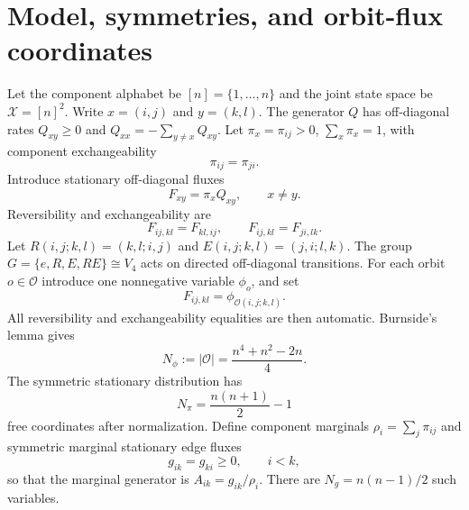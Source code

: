 \documentclass[10pt]{article}
\begin{document}
\section{Model, symmetries, and orbit-flux coordinates}
Let the component alphabet be $[n]=\{1,\dots,n\}$ and the joint state space be $\mathcal X=[n]^2$.  Write $x=(i,j)$ and $y=(k,l)$.  The generator $Q$ has off-diagonal rates $Q_{xy}\ge0$ and $Q_{xx}=-\sum_{y\ne x}Q_{xy}$.  Let $\pi_x=\pi_{ij}>0$, $\sum_x\pi_x=1$, with component exchangeability
\begin{equation}
\pi_{ij}=\pi_{ji}.
\end{equation}
Introduce stationary off-diagonal fluxes
\begin{equation}
F_{xy}=\pi_xQ_{xy},\qquad x\ne y.
\end{equation}
Reversibility and exchangeability are
\begin{equation}
F_{ij,kl}=F_{kl,ij},\qquad F_{ij,kl}=F_{ji,lk}.
\end{equation}
Let $R(i,j;k,l)=(k,l;i,j)$ and $E(i,j;k,l)=(j,i;l,k)$.  The group $G=\{e,R,E,RE\}\cong V_4$ acts on directed off-diagonal transitions.  For each orbit $o\in\mathcal O$ introduce one nonnegative variable $\phi_o$, and set
\begin{equation}
F_{ij,kl}=\phi_{\mathcal O(i,j;k,l)}.
\end{equation}
All reversibility and exchangeability equalities are then automatic.  Burnside's lemma gives
\begin{equation}
N_\phi:=|\mathcal O|=\frac{n^4+n^2-2n}{4}.
\end{equation}
The symmetric stationary distribution has
\begin{equation}
N_\pi=\frac{n(n+1)}2-1
\end{equation}
free coordinates after normalization.  Define component marginals $\rho_i=\sum_j\pi_{ij}$ and symmetric marginal stationary edge fluxes
\begin{equation}
g_{ik}=g_{ki}\ge0,\qquad i<k,
\end{equation}
so that the marginal generator is $A_{ik}=g_{ik}/\rho_i$.  There are $N_g=n(n-1)/2$ such variables.
\end{document}
